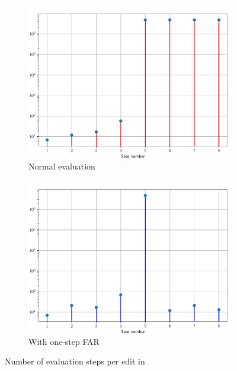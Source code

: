 \begin{figure}
  \centering
  \begin{subfigure}{0.7\textwidth}
    \includegraphics[width=\textwidth]{img/perf_no_far.pdf}
    \caption{Normal evaluation}
    \label{fig:perf-no-far}
  \end{subfigure}
  \begin{subfigure}{0.7\textwidth}
    \includegraphics[width=\textwidth]{img/perf_far.pdf}
    \caption{With one-step FAR}
    \label{fig:perf-far-far}
  \end{subfigure}
  \caption{Number of evaluation steps per edit in }
  \label{fig:perf-far}
\end{figure}

